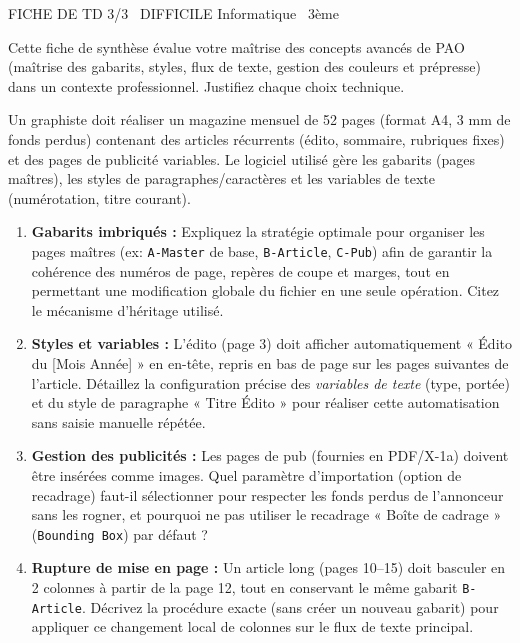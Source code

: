 \documentclass[11pt]{article}
\begin{document}
\begin{tcolorbox}[enhanced,colback=popink,colframe=popink,arc=10pt,boxrule=0pt,left=12pt,right=12pt,top=9pt,bottom=9pt]
{\color{white}\popxbold\small FICHE DE TD 3/3 \textbullet\ DIFFICILE \hfill Informatique \textbullet\ 3ème\par}
\end{tcolorbox}
\vspace{4pt}
\noindent Cette fiche de synthèse évalue votre maîtrise des concepts avancés de PAO (maîtrise des gabarits, styles, flux de texte, gestion des couleurs et prépresse) dans un contexte professionnel. Justifiez chaque choix technique.

\begin{exercice}
Un graphiste doit réaliser un magazine mensuel de 52 pages (format A4, 3 mm de fonds perdus) contenant des articles récurrents (édito, sommaire, rubriques fixes) et des pages de publicité variables. Le logiciel utilisé gère les gabarits (pages maîtres), les styles de paragraphes/caractères et les variables de texte (numérotation, titre courant).

\begin{enumerate}
    \item \textbf{Gabarits imbriqués :} Expliquez la stratégie optimale pour organiser les pages maîtres (ex: \texttt{A-Master} de base, \texttt{B-Article}, \texttt{C-Pub}) afin de garantir la cohérence des numéros de page, repères de coupe et marges, tout en permettant une modification globale du fichier en une seule opération. Citez le mécanisme d'héritage utilisé.
    \item \textbf{Styles et variables :} L'édito (page 3) doit afficher automatiquement « Édito du [Mois Année] » en en-tête, repris en bas de page sur les pages suivantes de l'article. Détaillez la configuration précise des \textit{variables de texte} (type, portée) et du style de paragraphe « Titre Édito » pour réaliser cette automatisation sans saisie manuelle répétée.
    \item \textbf{Gestion des publicités :} Les pages de pub (fournies en PDF/X-1a) doivent être insérées comme images. Quel paramètre d'importation (option de recadrage) faut-il sélectionner pour respecter les fonds perdus de l'annonceur sans les rogner, et pourquoi ne pas utiliser le recadrage « Boîte de cadrage » (\texttt{Bounding Box}) par défaut ?
    \item \textbf{Rupture de mise en page :} Un article long (pages 10--15) doit basculer en 2 colonnes à partir de la page 12, tout en conservant le même gabarit \texttt{B-Article}. Décrivez la procédure exacte (sans créer un nouveau gabarit) pour appliquer ce changement local de colonnes sur le flux de texte principal.
\end{enumerate}
\end{exercice}
\end{document}
